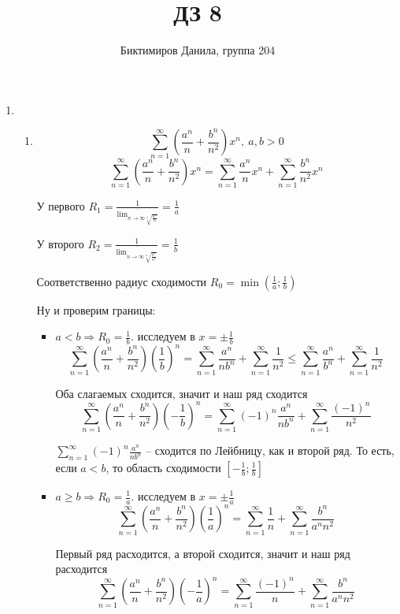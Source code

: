 \documentclass[11pt]{article}
\begin{document}
	
	\author{Биктимиров Данила, группа 204}
	\title{ДЗ 8}
	\date{}
	\maketitle
	
	\medskip
	
	\begin{enumerate}
		\item \begin{enumerate}
			\item $$\sum_{n=1}^{\infty} \left(\frac{a^n}{n} + \frac{b^n}{n^2}\right)x^n, \: a,b>0$$
			$$ \sum_{n=1}^{\infty} \left(\frac{a^n}{n} + \frac{b^n}{n^2}\right)x^n = \sum_{n=1}^{\infty} \frac{a^n}{n}x^n + \sum_{n=1}^{\infty} \frac{b^n}{n^2}x^n$$
			
			У первого $R_1=\frac{1}{\overline{\lim_{n\to \infty \sqrt[n]{\frac{a^n}{n}}}}} = \frac{1}{a}$
			
			У второго $R_2=\frac{1}{\overline{\lim_{n\to \infty \sqrt[n]{\frac{b^n}{n^2}}}}} = \frac{1}{b}$
			
			Соответственно радиус сходимости $R_0 = \min \left(\frac{1}{a};\frac{1}{b}\right)$
			
			Ну и проверим границы:
			\begin{itemize}
				\item $a<b\Rightarrow R_0=\frac{1}{b}$. исследуем  в $x=\pm\frac{1}{b}$
				$$ \sum_{n=1}^{\infty} \left(\frac{a^n}{n} + \frac{b^n}{n^2}\right)\left(\frac{1}{b}\right)^n = \sum_{n=1}^{\infty} \frac{a^n}{nb^n}+\sum_{n=1}^{\infty} \frac{1}{n^2} \le \sum_{n=1}^{\infty} \frac{a^n}{b^n}+\sum_{n=1}^{\infty} \frac{1}{n^2} $$
				
				Оба слагаемых сходится, значит и наш ряд сходится
				$$ \sum_{n=1}^{\infty} \left(\frac{a^n}{n} + \frac{b^n}{n^2}\right)\left(-\frac{1}{b}\right)^n = \sum_{n=1}^{\infty}(-1)^n \frac{a^n}{nb^n}+\sum_{n=1}^{\infty} \frac{(-1)^n}{n^2} $$
				
				$\sum_{n=1}^{\infty}(-1)^n
				 \frac{a^n}{nb^n}$ -- сходится по Лейбницу, как и второй ряд. То есть, если $a<b$, то область сходимости $[-\frac{1}{b};\frac{1}{b}]$
				
				\item $a\ge b\Rightarrow R_0=\frac{1}{a}$. исследуем  в $x=\pm\frac{1}{a}$
				$$ \sum_{n=1}^{\infty} \left(\frac{a^n}{n} + \frac{b^n}{n^2}\right)\left(\frac{1}{a}\right)^n = \sum_{n=1}^{\infty} \frac{1}{n}+\sum_{n=1}^{\infty} \frac{b^n}{a^nn^2} $$
				
				Первый ряд расходится, а второй сходится, значит и наш ряд расходится
				$$ \sum_{n=1}^{\infty} \left(\frac{a^n}{n} + \frac{b^n}{n^2}\right)\left(-\frac{1}{a}\right)^n = \sum_{n=1}^{\infty} \frac{(-1)^n}{n}+\sum_{n=1}^{\infty} \frac{b^n}{a^nn^2} $$
				

\end{itemize}
\end{enumerate}
\end{enumerate}
\end{document}
